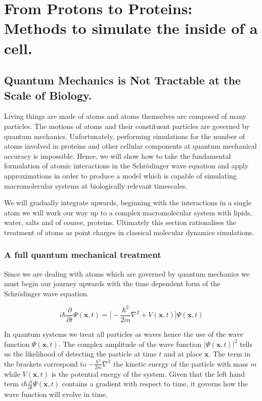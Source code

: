 \chapter{From Protons to Proteins: Methods to simulate the inside of a cell.}
\label{chap:methods}

\section{Quantum Mechanics is Not Tractable at the Scale of Biology.}
Living things are made of atoms and atoms themselves are composed of many particles. The motions of atoms and their constituent particles are governed by quantum mechanics. Unfortunately, performing simulations for the number of atoms involved in proteins and other cellular components at quantum mechanical accuracy is impossible. Hence, we will show how to take the fundamental formulation of atomic interactions in the Schr\"{o}dinger wave equation and apply approximations in order to produce a model which is capable of simulating macromolecular systems at biologically relevant timescales. 

We will gradually integrate upwards, beginning with the interactions in a single atom we will work our way up to a complex macromolecular system with lipids, water, salts and of course, proteins. Ultimately this section rationalises the treatment of atoms as point charges in classical molecular dynamics simulations.

\subsection{A full quantum mechanical treatment}
Since we are dealing with atoms which are governed by quantum mechanics we must begin our journey upwards with the time dependent form of the Schr\"{o}dinger wave equation. 

\begin{equation}
i\hbar \frac {\partial}{\partial t} \Psi (\textbf{x},t) = \big[ -\frac{\hbar ^2}{2m}\nabla^2 + V (\textbf{x}, t) \big] \Psi (\textbf{x},t) 
\label {schordinger_time_dependent}
\end{equation}

In quantum systems we treat all particles as waves hence the use of the wave function $\Psi (\textbf{x},t)$. The complex amplitude of the wave function $|\Psi (\textbf {x}, t)|^2$ tells us the likelihood of detecting the particle at time $t$ and at place $\textbf{x}$. The term in the brackets correspond to $-\frac{\hbar ^2}{2m}\nabla^2 $ the kinetic energy of the particle with mass $m$ while $V (\textbf{x}, t)$ is the potential energy of the system. Given that the left hand term $i\hbar \frac {\partial}{\partial t} \Psi (\textbf{x},t)$ contains a gradient with respect to time, it governs how the wave function will evolve in time.

